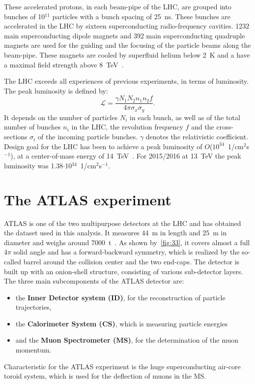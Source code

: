  These accelerated protons, in each beam-pipe of the LHC, are grouped into bunches of 10$^{11}$ particles with a bunch spacing of 25~ns. These bunches are accelerated in the LHC by sixteen superconducting radio-frequency cavities. 1232 main superconducting dipole magnets and 392 main superconducting quadruple magnets are used for the guiding and the focusing of the particle beams along the beam-pipe. These magnets are cooled by superfluid helium below 2~K and a have a maximal field strength above 8~TeV~\cite{Evans:2008zzb}.   


 The LHC  exceeds all experiences of previous experiments,  in terms of luminosity. The peak luminosity is defined by:
\begin{equation}
\mathscr{L} = \frac{\gamma N_1N_2n_1n_2f}{4\pi \sigma_x \sigma_y }.
\end{equation}
 It depends on the number of particles $N_i$ in each bunch, as well as of the total number of bunches $n_i$ in the LHC, the revolution frequency $f$ and the cross-sections $\sigma_i$ of the incoming particle bunches. $\gamma$ denotes the relativistic coefficient. Design goal for the LHC has been to achieve a peak luminosity of $O$($10^{34}$~1/cm$^2$s$^{-1}$), at a center-of-mass energy of 14~TeV~\cite{Bruning:2004ej}. For 2015/2016 at 13~TeV the peak luminosity was 1.38$\cdot$10$^{34}$~1/cm$^2$s$^{-1}$.  
 
 
\section{The ATLAS experiment}\label{ATLAS}
 ATLAS  is one of the two multipurpose detectors at the LHC and has obtained the dataset used in this analysis. It measures 44~m in length and 25~m in diameter and weighs around 7000~t~\cite{Aad:2008zzm}. 
 As shown by~\cref{fig:33}, it covers almost a full 4$\pi$ solid angle and has a forward-backward symmetry, which is realized by the so-called barrel around the collision center and the two end-caps. The detector is built up with an onion-shell structure, consisting of various sub-detector layers. The three main subcomponents of the ATLAS detector are:
 \begin{itemize}
 	\item the \textbf{Inner Detector system (ID)}, for the reconstruction of particle trajectories, 
 	\item  the \textbf{Calorimeter System (CS)}, which is measuring particle energies
 	\item  and the \textbf{Muon Spectrometer (MS)}, for the determination of the muon momentum.
 \end{itemize} 
Characteristic for the ATLAS experiment is the huge superconducting air-core toroid system, which is used for the deflection of muons in the MS. 

